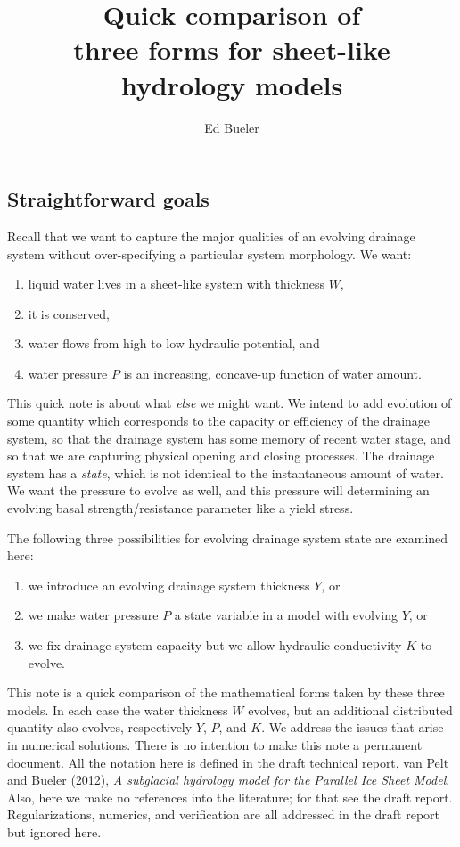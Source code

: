 \documentclass[11pt]{amsart}
\title[Comparison of three forms for sheet-like hydrology models]{Quick comparison of \\ three forms for sheet-like hydrology models}
\author{Ed Bueler}
\begin{document}
\maketitle

\thispagestyle{empty}
\medskip

\subsection*{Straightforward goals}  Recall that we want to capture the major qualities of an evolving drainage system without over-specifying a particular system morphology.  We want:
\renewcommand{\labelenumi}{\textbf{(\alph{enumi})}}
\begin{enumerate}
\item liquid water lives in a sheet-like system with thickness $W$,
\item it is conserved,
\item water flows from high to low hydraulic potential, and
\item water pressure $P$ is an increasing, concave-up function of water amount.
\end{enumerate}

This quick note is about what \emph{else} we might want.  We intend to add evolution of some quantity which corresponds to the capacity or efficiency of the drainage system, so that the drainage system has some memory of recent water stage, and so that we are capturing physical opening and closing processes.  The drainage system has a \emph{state}, which is not identical to the instantaneous amount of water.  We want the pressure to evolve as well, and this pressure will determining an evolving basal strength/resistance parameter like a yield stress.

The following three possibilities for evolving drainage system state are examined here: 
\renewcommand{\labelenumi}{\textbf{\Roman{enumi}.}}
\begin{enumerate}
\item we introduce an evolving drainage system thickness $Y$, or 
\item we make water pressure $P$ a state variable in a model with evolving $Y$, or
\item we fix drainage system capacity but we allow hydraulic conductivity $K$ to evolve.
\end{enumerate}
This note is a quick comparison of the mathematical forms taken by these three models.  In each case the water thickness $W$ evolves, but an additional distributed quantity also evolves, respectively $Y$, $P$, and $K$.  We address the issues that arise in numerical solutions.  There is no intention to make this note a permanent document.  All the notation here is defined in the draft technical report, van Pelt and Bueler (2012), \emph{A subglacial hydrology model for the Parallel Ice Sheet Model}.  Also, here we make no references into the literature; for that see the draft report.  Regularizations, numerics, and verification are all addressed in the draft report but ignored here.
\end{document}
